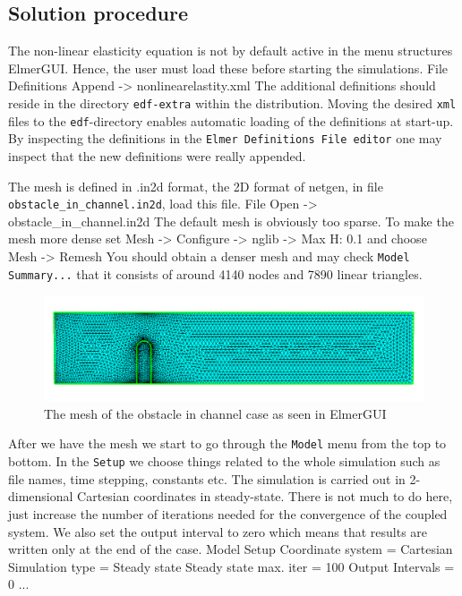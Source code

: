 \subsection*{Solution procedure}


The non-linear elasticity equation is not by default active in the menu structures ElmerGUI. 
Hence, the user must load these before starting the simulations.
\ttbegin
File 
  Definitions
    Append -> nonlinearelastity.xml
\ttend
The additional definitions should reside in the directory \texttt{edf-extra} within the distribution.
Moving the desired \texttt{xml} files to the \texttt{edf}-directory enables automatic loading of the 
definitions at start-up. By inspecting the definitions in the \texttt{Elmer Definitions File editor} one
may inspect that the new definitions were really appended. 


The mesh is defined in .in2d format, the 2D format of 
netgen, in file \texttt{obstacle\_in\_channel.in2d}, load this file.
\ttbegin
File 
  Open -> obstacle\_in\_channel.in2d
\ttend
The default mesh is obviously too sparse. To make the mesh 
more dense set
\ttbegin
Mesh -> Configure -> nglib -> Max H: 0.1 
\ttend
and choose
\ttbegin
Mesh -> Remesh 
\ttend
You should obtain a denser mesh and may check \texttt{Model Summary...} that it consists 
of around 4140 nodes and 7890 linear triangles.

\begin{figure}[h]
\centering
\includegraphics[width=140mm]{fsi_obstacle_gui}
\caption{The mesh of the obstacle in channel case as seen in ElmerGUI}\label{fg:obstacle_in_channel_mesh}
\end{figure} 


After we have the mesh we start to go through the \texttt{Model} menu from the top to bottom. 
In the \texttt{Setup} we choose things related to the whole simulation such as file names, 
time stepping, constants etc.
The simulation is carried out in 2-dimensional Cartesian
coordinates in steady-state. There is not much to do here, just increase the number of iterations needed 
for the convergence of the coupled system. We also set the output interval to zero which means that results are 
written only at the end of the case.
\ttbegin
Model
  Setup 
    Coordinate system = Cartesian
    Simulation type = Steady state
    Steady state max. iter = 100
    Output Intervals = 0
    ...
\ttend

